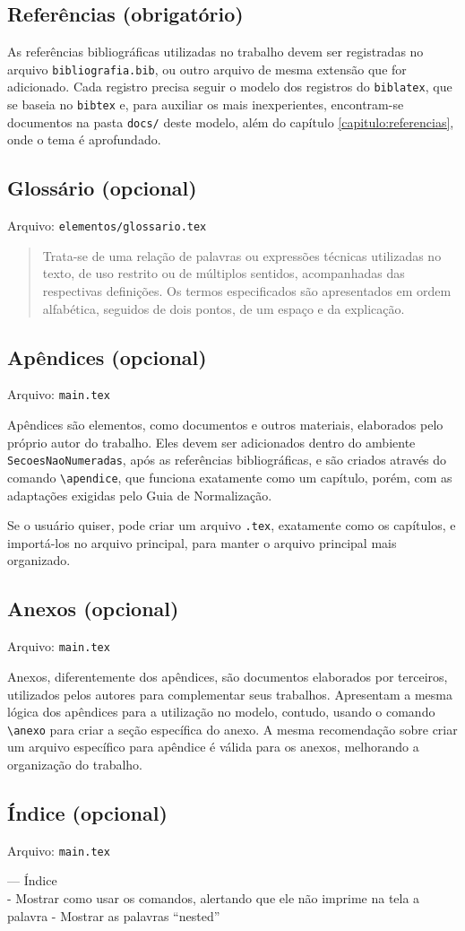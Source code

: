 \subsection{Referências (obrigatório)}
    As referências bibliográficas utilizadas no trabalho devem ser registradas no arquivo \texttt{bibliografia.bib}, ou outro arquivo de mesma extensão que for adicionado. Cada registro precisa seguir o modelo dos registros do \texttt{biblatex}, que se baseia no \texttt{bibtex} e, para auxiliar os mais inexperientes, encontram-se documentos na pasta \texttt{docs/} deste modelo, além do capítulo \ref{capitulo:referencias}, onde o tema é aprofundado.

\subsection{Glossário (opcional)}
    Arquivo: \texttt{elementos/glossario.tex}
    
    \blockcquote[p. 33]{livro:iffar-guia-normalizacao-2022}{Trata-se de uma relação de palavras ou expressões técnicas utilizadas no texto, de uso restrito ou de múltiplos sentidos, acompanhadas das respectivas definições. Os termos especificados são apresentados em ordem alfabética, seguidos de dois pontos, de um espaço e da
    explicação.}

\subsection{Apêndices (opcional)}
    Arquivo: \texttt{main.tex}
    
    Apêndices são elementos, como documentos e outros materiais, elaborados pelo próprio autor do trabalho. Eles devem ser adicionados dentro do ambiente \texttt{SecoesNaoNumeradas}, após as referências bibliográficas, e são criados através do comando \verb|\apendice|, que funciona exatamente como um capítulo, porém, com as adaptações exigidas pelo Guia de Normalização.

    Se o usuário quiser, pode criar um arquivo \texttt{.tex}, exatamente como os capítulos, e importá-los no arquivo principal, para manter o arquivo principal mais organizado.

\subsection{Anexos (opcional)}
    Arquivo: \texttt{main.tex}
    
    Anexos, diferentemente dos apêndices, são documentos elaborados por terceiros, utilizados pelos autores para complementar seus trabalhos. Apresentam a mesma lógica dos apêndices para a utilização no modelo, contudo, usando o comando \verb|\anexo| para criar a seção específica do anexo. A mesma recomendação sobre criar um arquivo específico para apêndice é válida para os anexos, melhorando a organização do trabalho.

\subsection{Índice (opcional)}
    Arquivo: \texttt{main.tex}

--- Índice\\
    - Mostrar como usar os comandos, alertando que ele não imprime na tela a palavra
    - Mostrar as palavras ``nested''
    